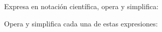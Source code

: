 \documentclass[addpoints,spanish, 12pt,a4paper]{exam}
\begin{document}
\begin{questions}
\addpoints

\question Expresa en notación científica, opera y simplifica:

 

\question Opera y simplifica cada una de estas expresiones:
\begin{parts}



\end{parts}
\end{questions}
\end{document}
